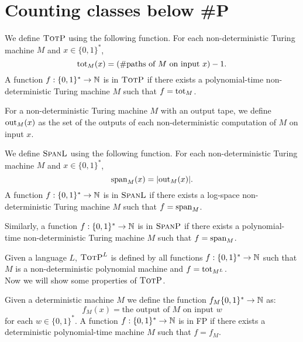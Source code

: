 \section{Counting classes below \#P}

We define $\totp$ using the following function. For each non-deterministic Turing machine $M$ and $x\in\{0,1\}^*$,
$$
	\tot_M(x) = (\text{\#paths of $M$ on input $x$}) - 1.
$$
A function $f:\{0,1\}^*\to\N$ is in $\totp$ if there exists a polynomial-time non-deterministic Turing machine $M$ such that $f = \tot_M$.

For a non-deterministic Turing machine $M$ with an output tape, we define $\out_M(x)$ as the set of the outputs of each non-deterministic computation of $M$ on input $x$.

We define $\spanl$ using the following function. For each non-deterministic Turing machine $M$ and $x\in\{0,1\}^*$,
\[
	\sp_M(x) = \vert\out_M(x)\vert.
\]
A function $f:\{0,1\}^*\to\N$ is in $\spanl$ if there exists a log-space non-deterministic Turing machine $M$ such that $f = \sp_M$.

Similarly, a function  $f:\{0,1\}^*\to\N$ is in $\spanp$ if there exists a polynomial-time non-deterministic Turing machine $M$ such that $f = \sp_M$.

Given a language $L$, $\totp^{L}$ is defined by all functions $f:\{0,1\}^*\to\N$ such that $M$ is a non-deterministic polynomial machine and $f = \tot_{M^L}$.
\\

Now we will show some properties of $\totp$.

Given a deterministic machine $M$ we define the function $f_M\{0,1\}^*\to\N$ as:
\[
	f_M(x) = \text{the output of $M$ on input $w$}
\]
for each $w\in\{0,1\}^*$. A function $f:\{0,1\}^*\to\N$ is in FP if there exists a deterministic polynomial-time machine $M$ such that $f = f_M$.


